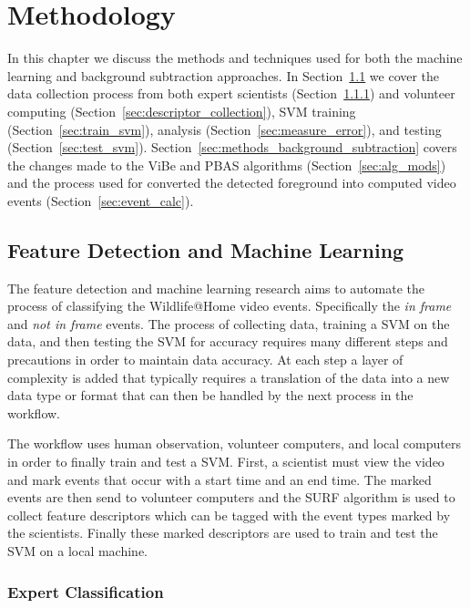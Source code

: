 \chapter{Methodology}
\label{ch:methodology}

In this chapter we discuss the methods and techniques used for both the machine learning and background subtraction approaches. In Section~\ref{sec:methods_machine_learning} we cover the data collection process from both expert scientists (Section~\ref{sec:expert_classification}) and volunteer computing (Section~\ref{sec:descriptor_collection}), SVM training (Section~\ref{sec:train_svm}), analysis (Section~\ref{sec:measure_error}), and testing (Section~\ref{sec:test_svm}). Section~\ref{sec:methods_background_subtraction} covers the changes made to the ViBe and PBAS algorithms (Section~\ref{sec:alg_mods}) and the process used for converted the detected foreground into computed video events (Section~\ref{sec:event_calc}).


\section{Feature Detection and Machine Learning}
\label{sec:methods_machine_learning}

The feature detection and machine learning research aims to automate the process of classifying the Wildlife@Home video events. Specifically the \emph{in frame} and \emph{not in frame} events. The process of collecting data, training a SVM on the data, and then testing the SVM for accuracy requires many different steps and precautions in order to maintain data accuracy. At each step a layer of complexity is added that typically requires a translation of the data into a new data type or format that can then be handled by the next process in the workflow.

The workflow uses human observation, volunteer computers, and local computers in order to finally train and test a SVM\@. First, a scientist must view the video and mark events that occur with a start time and an end time. The marked events are then send to volunteer computers and the SURF algorithm is used to collect feature descriptors which can be tagged with the event types marked by the scientists. Finally these marked descriptors are used to train and test the SVM on a local machine.


\subsection{Expert Classification}
\label{sec:expert_classification}

